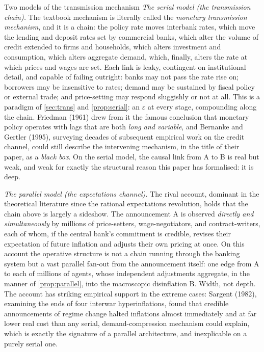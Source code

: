 \documentclass[11pt]{article}
\theoremstyle{definition}
\newcommand{\eps}{\varepsilon}
\begin{document}
\begin{techbox}{Two models of the transmission mechanism}
\emph{The serial model (the transmission chain).} The textbook mechanism is literally called the \emph{monetary transmission mechanism}, and it is a chain: the policy rate moves interbank rates, which move the lending and deposit rates set by commercial banks, which alter the volume of credit extended to firms and households, which alters investment and consumption, which alters aggregate demand, which, finally, alters the rate at which prices and wages are set. Each link is leaky, contingent on institutional detail, and capable of failing outright: banks may not pass the rate rise on; borrowers may be insensitive to rates; demand may be sustained by fiscal policy or external trade; and price-setting may respond sluggishly or not at all. This is a paradigm of \cref{sec:trans} and \cref{prop:serial}: an $\eps$ at every stage, compounding along the chain. Friedman (1961) drew from it the famous conclusion that monetary policy operates with lags that are both \emph{long and variable}, and Bernanke and Gertler (1995), surveying decades of subsequent empirical work on the credit channel, could still describe the intervening mechanism, in the title of their paper, as a \emph{black box}. On the serial model, the causal link from A to B is real but weak, and weak for exactly the structural reason this paper has formalised: it is deep.

\emph{The parallel model (the expectations channel).} The rival account, dominant in the theoretical literature since the rational expectations revolution, holds that the chain above is largely a sideshow. The announcement A is observed \emph{directly and simultaneously} by millions of price-setters, wage-negotiators, and contract-writers, each of whom, if the central bank's commitment is credible, revises their expectation of future inflation and adjusts their own pricing at once. On this account the operative structure is not a chain running through the banking system but a vast parallel fan-out from the announcement itself: one edge from A to each of millions of agents, whose independent adjustments aggregate, in the manner of \cref{prop:parallel}, into the macroscopic disinflation B. Width, not depth. The account has striking empirical support in the extreme cases: Sargent (1982), examining the ends of four interwar hyperinflations, found that credible announcements of regime change halted inflations almost immediately and at far lower real cost than any serial, demand-compression mechanism could explain, which is exactly the signature of a parallel architecture, and inexplicable on a purely serial one.
\end{techbox}
\end{document}
